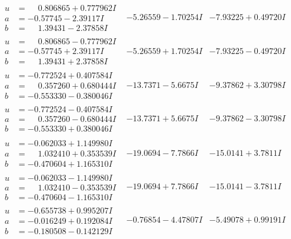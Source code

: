 \documentclass[1p]{elsarticle_modified}
\theoremstyle{definition}
\begin{document}
$$\begin{array}{c|c|c}
\begin{aligned}
u &= \phantom{-}0.806865 + 0.777962 I \\
a &= -0.57745 - 2.39117 I \\
b &= \phantom{-}1.39431 - 2.37858 I\end{aligned}
 & -5.26559 - 1.70254 I & -7.93225 + 0.49720 I \\ \hline\begin{aligned}
u &= \phantom{-}0.806865 - 0.777962 I \\
a &= -0.57745 + 2.39117 I \\
b &= \phantom{-}1.39431 + 2.37858 I\end{aligned}
 & -5.26559 + 1.70254 I & -7.93225 - 0.49720 I \\ \hline\begin{aligned}
u &= -0.772524 + 0.407584 I \\
a &= \phantom{-}0.357260 + 0.680444 I \\
b &= -0.553330 - 0.380046 I\end{aligned}
 & -13.7371 - 5.6675 I & -9.37862 + 3.30798 I \\ \hline\begin{aligned}
u &= -0.772524 - 0.407584 I \\
a &= \phantom{-}0.357260 - 0.680444 I \\
b &= -0.553330 + 0.380046 I\end{aligned}
 & -13.7371 + 5.6675 I & -9.37862 - 3.30798 I \\ \hline\begin{aligned}
u &= -0.062033 + 1.149980 I \\
a &= \phantom{-}1.032410 + 0.353539 I \\
b &= -0.470604 + 1.165310 I\end{aligned}
 & -19.0694 - 7.7866 I & -15.0141 + 3.7811 I \\ \hline\begin{aligned}
u &= -0.062033 - 1.149980 I \\
a &= \phantom{-}1.032410 - 0.353539 I \\
b &= -0.470604 - 1.165310 I\end{aligned}
 & -19.0694 + 7.7866 I & -15.0141 - 3.7811 I \\ \hline\begin{aligned}
u &= -0.655738 + 0.995207 I \\
a &= -0.016249 + 0.192084 I \\
b &= -0.180508 - 0.142129 I\end{aligned}
 & -0.76854 - 4.47807 I & -5.49078 + 0.99191 I \\ \hline\begin{aligned}

\end{aligned}
\end{array}$$
\end{document}
